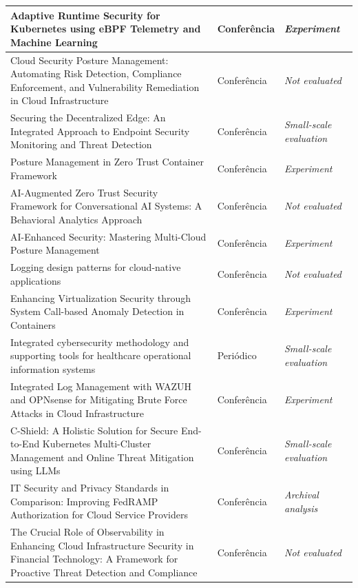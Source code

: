 {\begin{longtable}{p{8.4cm}p{2.2cm}p{3.4cm}}
Adaptive Runtime Security for Kubernetes using eBPF Telemetry and Machine Learning~\cite{joshisegireddy2026} & Conferência & \textit{Experiment} \\ \hline
Cloud Security Posture Management: Automating Risk Detection, Compliance Enforcement, and Vulnerability Remediation in Cloud Infrastructure~\cite{ali2024} & Conferência & \textit{Not evaluated} \\ \hline
Securing the Decentralized Edge: An Integrated Approach to Endpoint Security Monitoring and Threat Detection~\cite{bungei2026} & Conferência & \textit{Small-scale evaluation} \\ \hline
Posture Management in Zero Trust Container Framework~\cite{upadhyaya2025} & Conferência & \textit{Experiment} \\ \hline
AI-Augmented Zero Trust Security Framework for Conversational AI Systems: A Behavioral Analytics Approach~\cite{aftab2026} & Conferência & \textit{Not evaluated} \\ \hline
AI-Enhanced Security: Mastering Multi-Cloud Posture Management~\cite{kumar2026} & Conferência & \textit{Experiment} \\ \hline
Logging design patterns for cloud-native applications~\cite{albuquerque2024} & Conferência & \textit{Not evaluated} \\ \hline
Enhancing Virtualization Security through System Call-based Anomaly Detection in Containers~\cite{zhang2025} & Conferência & \textit{Experiment} \\ \hline
Integrated cybersecurity methodology and supporting tools for healthcare operational information systems~\cite{coutinho2023} & Periódico & \textit{Small-scale evaluation} \\ \hline
Integrated Log Management with WAZUH and OPNsense for Mitigating Brute Force Attacks in Cloud Infrastructure~\cite{setiawan2025} & Conferência & \textit{Experiment} \\ \hline
C-Shield: A Holistic Solution for Secure End-to-End Kubernetes Multi-Cluster Management and Online Threat Mitigation using LLMs~\cite{kalafatidis2025} & Conferência & \textit{Small-scale evaluation} \\ \hline
IT Security and Privacy Standards in Comparison: Improving FedRAMP Authorization for Cloud Service Providers~\cite{giulio2017} & Conferência & \textit{Archival analysis} \\ \hline
The Crucial Role of Observability in Enhancing Cloud Infrastructure Security in Financial Technology: A Framework for Proactive Threat Detection and Compliance~\cite{mahida2026} & Conferência & \textit{Not evaluated} \\ \hline

\end{longtable}}
